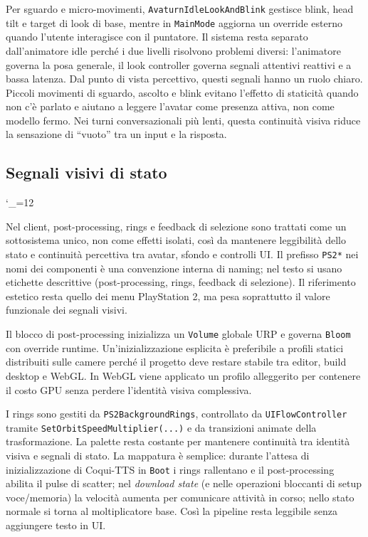 Per sguardo e micro-movimenti, \texttt{AvaturnIdleLookAndBlink} gestisce blink, head tilt e target di look di base, mentre in \texttt{MainMode} aggiorna un override esterno quando l'utente interagisce con il puntatore. Il sistema resta separato dall'animatore idle perché i due livelli risolvono problemi diversi: l'animatore governa la posa generale, il look controller governa segnali attentivi reattivi e a bassa latenza. Dal punto di vista percettivo, questi segnali hanno un ruolo chiaro. Piccoli movimenti di sguardo, ascolto e blink evitano l'effetto di staticità quando non c'è parlato e aiutano a leggere l'avatar come presenza attiva, non come modello fermo. Nei turni conversazionali più lenti, questa continuità visiva riduce la sensazione di ``vuoto'' tra un input e la risposta.

\endgroup

\subsection{Segnali visivi di stato}
\label{subsec:ps2-postprocessing}
\begingroup
\setlength{\emergencystretch}{3em}
\hfuzz=200pt
\sloppy
\catcode`_=12\relax

Nel client, post-processing, rings e feedback di selezione sono trattati come un sottosistema unico, non come effetti isolati, così da mantenere leggibilità dello stato e continuità percettiva tra avatar, sfondo e controlli UI. Il prefisso \texttt{PS2*} nei nomi dei componenti è una convenzione interna di naming; nel testo si usano etichette descrittive (post-processing, rings, feedback di selezione). Il riferimento estetico resta quello dei menu PlayStation 2, ma pesa soprattutto il valore funzionale dei segnali visivi.

Il blocco di post-processing inizializza un \texttt{Volume} globale URP e governa \texttt{Bloom} con override runtime. Un'inizializzazione esplicita è preferibile a profili statici distribuiti sulle camere perché il progetto deve restare stabile tra editor, build desktop e WebGL. In WebGL viene applicato un profilo alleggerito per contenere il costo GPU senza perdere l'identità visiva complessiva.

I rings sono gestiti da \texttt{PS2BackgroundRings}, controllato da \texttt{UIFlowController} tramite \texttt{SetOrbitSpeedMultiplier(...)} e da transizioni animate della trasformazione. La palette resta costante per mantenere continuità tra identità visiva e segnali di stato. La mappatura è semplice: durante l'attesa di inizializzazione di Coqui-TTS in \texttt{Boot} i rings rallentano e il post-processing abilita il pulse di scatter; nel \emph{download state} (e nelle operazioni bloccanti di setup voce/memoria) la velocità aumenta per comunicare attività in corso; nello stato normale si torna al moltiplicatore base. Così la pipeline resta leggibile senza aggiungere testo in UI.

